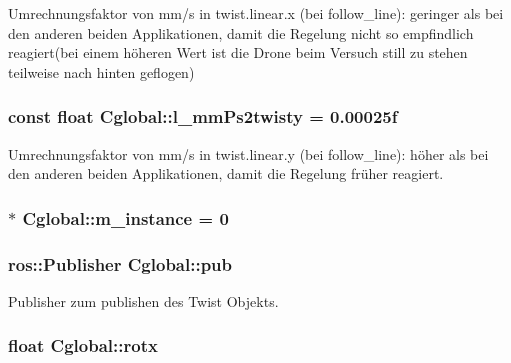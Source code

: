 Umrechnungsfaktor von mm/s in twist.linear.x (bei follow\_\-line): geringer als bei den anderen beiden Applikationen, damit die Regelung nicht so empfindlich reagiert(bei einem höheren Wert ist die Drone beim Versuch still zu stehen teilweise nach hinten geflogen) 

\hypertarget{class_cglobal_af8f19427d5da8e6c88098b61e8676786}{
\subsubsection[{l\_\-mmPs2twisty}]{\setlength{\rightskip}{0pt plus 5cm}const float {\bf Cglobal::l\_\-mmPs2twisty} = 0.00025f}}
\label{class_cglobal_af8f19427d5da8e6c88098b61e8676786}


Umrechnungsfaktor von mm/s in twist.linear.y (bei follow\_\-line): höher als bei den anderen beiden Applikationen, damit die Regelung früher reagiert. 

\hypertarget{class_cglobal_afb7ab45601acda975c029de5db73b3ea}{
\subsubsection[{m\_\-instance}]{ $\ast$ {\bf Cglobal::m\_\-instance} = 0}}
\label{class_cglobal_afb7ab45601acda975c029de5db73b3ea}
\hypertarget{class_cglobal_af3a06302b3bd19de728064359241c1a1}{
\subsubsection[{pub}]{\setlength{\rightskip}{0pt plus 5cm}ros::Publisher {\bf Cglobal::pub}}}
\label{class_cglobal_af3a06302b3bd19de728064359241c1a1}


Publisher zum publishen des Twist Objekts. 

\hypertarget{class_cglobal_ad295728f5113d9a47527cf14262dea0e}{
\subsubsection[{rotx}]{\setlength{\rightskip}{0pt plus 5cm}float {\bf Cglobal::rotx}}}
\label{class_cglobal_ad295728f5113d9a47527cf14262dea0e}


